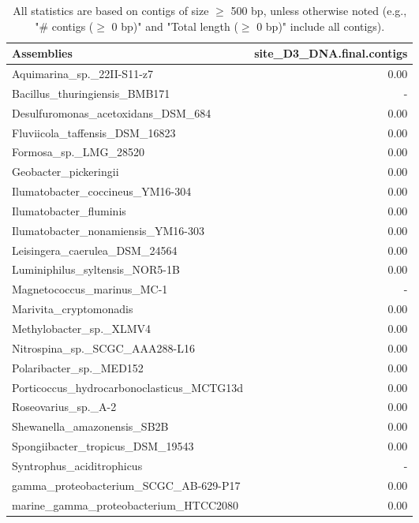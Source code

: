 \documentclass[12pt,a4paper]{article}
\begin{document}
\begin{table}[ht]
\begin{center}
\caption{All statistics are based on contigs of size $\geq$ 500 bp, unless otherwise noted (e.g., "\# contigs ($\geq$ 0 bp)" and "Total length ($\geq$ 0 bp)" include all contigs).}
\begin{tabular}{|l*{1}{|r}|}
\hline
Assemblies & site\_D3\_DNA.final.contigs \\ \hline
Aquimarina\_sp.\_22II-S11-z7 & 0.00 \\ \hline
Bacillus\_thuringiensis\_BMB171 & - \\ \hline
Desulfuromonas\_acetoxidans\_DSM\_684 & 0.00 \\ \hline
Fluviicola\_taffensis\_DSM\_16823 & 0.00 \\ \hline
Formosa\_sp.\_LMG\_28520 & 0.00 \\ \hline
Geobacter\_pickeringii & 0.00 \\ \hline
Ilumatobacter\_coccineus\_YM16-304 & 0.00 \\ \hline
Ilumatobacter\_fluminis & 0.00 \\ \hline
Ilumatobacter\_nonamiensis\_YM16-303 & 0.00 \\ \hline
Leisingera\_caerulea\_DSM\_24564 & 0.00 \\ \hline
Luminiphilus\_syltensis\_NOR5-1B & 0.00 \\ \hline
Magnetococcus\_marinus\_MC-1 & - \\ \hline
Marivita\_cryptomonadis & 0.00 \\ \hline
Methylobacter\_sp.\_XLMV4 & 0.00 \\ \hline
Nitrospina\_sp.\_SCGC\_AAA288-L16 & 0.00 \\ \hline
Polaribacter\_sp.\_MED152 & 0.00 \\ \hline
Porticoccus\_hydrocarbonoclasticus\_MCTG13d & 0.00 \\ \hline
Roseovarius\_sp.\_A-2 & 0.00 \\ \hline
Shewanella\_amazonensis\_SB2B & 0.00 \\ \hline
Spongiibacter\_tropicus\_DSM\_19543 & 0.00 \\ \hline
Syntrophus\_aciditrophicus & - \\ \hline
gamma\_proteobacterium\_SCGC\_AB-629-P17 & 0.00 \\ \hline
marine\_gamma\_proteobacterium\_HTCC2080 & 0.00 \\ \hline
\end{tabular}
\end{center}
\end{table}
\end{document}
